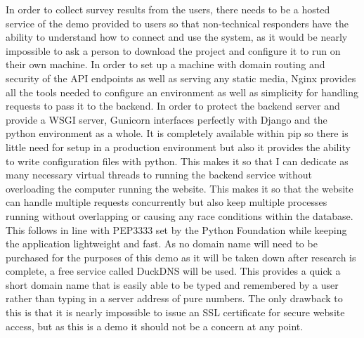In order to collect survey results from the users, there needs to be a hosted service of the demo provided to users so that non-technical responders have the ability to understand how to connect and use the system, as it would be nearly impossible to ask a person to download the project and configure it to run on their own machine. In order to set up a machine with domain routing and security of the API endpoints as well as serving any static media, Nginx provides all the tools needed to configure an environment as well as simplicity for handling requests to pass it to the backend.
\newline
\newline
In order to protect the backend server and provide a WSGI server, Gunicorn interfaces perfectly with Django and the python environment as a whole. It is completely available within pip so there is little need for setup in a production environment but also it provides the ability to write configuration files with python. This makes it so that I can dedicate as many necessary virtual threads to running the backend service without overloading the computer running the website. This makes it so that the website can handle multiple requests concurrently but also keep multiple processes running without overlapping or causing any race conditions within the database. This follows in line with PEP3333 set by the Python Foundation while keeping the application lightweight and fast.
\newline
\newline
As no domain name will need to be purchased for the purposes of this demo as it will be taken down after research is complete, a free service called DuckDNS will be used. This provides a quick a short domain name that is easily able to be typed and remembered by a user rather than typing in a server address of pure numbers. The only drawback to this is that it is nearly impossible to issue an SSL certificate for secure website access, but as this is a demo it should not be a concern at any point.